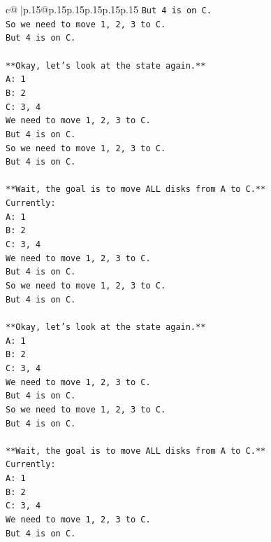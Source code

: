 \documentclass{article}
\begin{document}
{\begin{supertabular}{c@{$\;$}|p{.15\linewidth}@{}p{.15\linewidth}p{.15\linewidth}p{.15\linewidth}p{.15\linewidth}p{.15\linewidth}}
{{{\texttt{But 4 is on C.} \\
\texttt{So we need to move 1, 2, 3 to C.} \\
\texttt{But 4 is on C.} \\
\\ 
\texttt{**Okay, let's look at the state again.**} \\
\texttt{A: 1} \\
\texttt{B: 2} \\
\texttt{C: 3, 4} \\
\texttt{We need to move 1, 2, 3 to C.} \\
\texttt{But 4 is on C.} \\
\texttt{So we need to move 1, 2, 3 to C.} \\
\texttt{But 4 is on C.} \\
\\ 
\texttt{**Wait, the goal is to move ALL disks from A to C.**} \\
\texttt{Currently:} \\
\texttt{A: 1} \\
\texttt{B: 2} \\
\texttt{C: 3, 4} \\
\texttt{We need to move 1, 2, 3 to C.} \\
\texttt{But 4 is on C.} \\
\texttt{So we need to move 1, 2, 3 to C.} \\
\texttt{But 4 is on C.} \\
\\ 
\texttt{**Okay, let's look at the state again.**} \\
\texttt{A: 1} \\
\texttt{B: 2} \\
\texttt{C: 3, 4} \\
\texttt{We need to move 1, 2, 3 to C.} \\
\texttt{But 4 is on C.} \\
\texttt{So we need to move 1, 2, 3 to C.} \\
\texttt{But 4 is on C.} \\
\\ 
\texttt{**Wait, the goal is to move ALL disks from A to C.**} \\
\texttt{Currently:} \\
\texttt{A: 1} \\
\texttt{B: 2} \\
\texttt{C: 3, 4} \\
\texttt{We need to move 1, 2, 3 to C.} \\
\texttt{But 4 is on C.} \\
}}}
\end{supertabular}}
\end{document}
